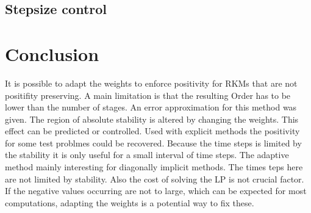 \documentclass[a4paper]{scrartcl}
\numberwithin{equation}{section}
\theoremstyle{plain}
\theoremstyle{definition}
\numberwithin{theorem}{section}
\newcommand{\1}{\mathbbm{1}}
\begin{document}
\subsection{Stepsize control}



\section{Conclusion} \label{sec:conclusion}
It is possible to adapt the weights to enforce positivity for RKMs that are not positifity preserving.
A main limitation is that the resulting Order has to be lower than the number of stages. 
An error approximation for this method was given. 
The region of absolute stability is altered by changing the weights. This effect can be predicted or controlled.
Used with explicit methods the positivity for some test problmes could be recovered. 
Because the time steps is limited by the stability it is only useful for a small interval of time steps.
The adaptive method mainly interesting for diagonally implicit methods. 
The times teps here are not limited by stability.
Also the cost of solving the LP is not crucial factor. 
If the negative values occurring are not to large, which can be expected for most computations, adapting the weights is a potential way to fix these.




\printbibliography
\end{document}
